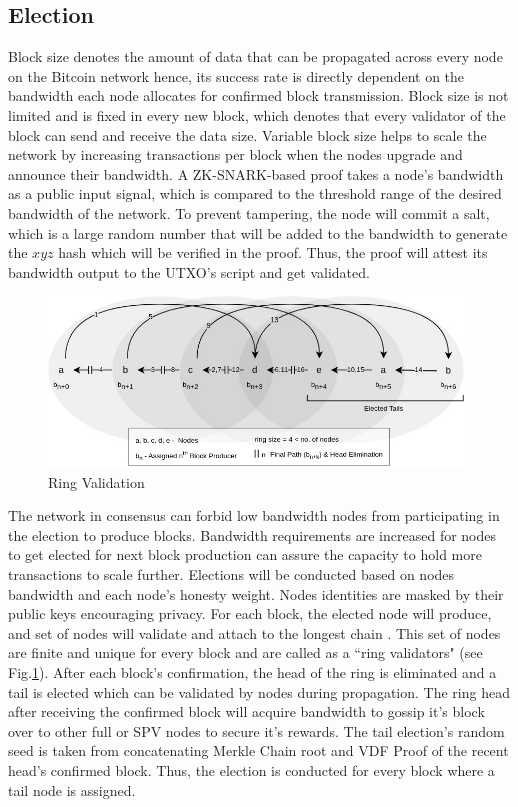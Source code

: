 \documentclass[a4paper,10pt]{article}
\begin{document}
\subsection{Election}
Block size denotes the amount of data that can be propagated across every node on the Bitcoin network hence, its success rate is directly dependent on the bandwidth each node allocates for confirmed block transmission. Block size is not limited and is fixed in every new block, which denotes that every validator of the block can send and receive the data size. Variable block size helps to scale the network by increasing transactions per block when the nodes upgrade and announce their bandwidth. A ZK-SNARK-based proof takes a node’s bandwidth as a public input signal, which is compared to the threshold range of the desired bandwidth of the network. To prevent tampering, the node will commit a salt, which is a large random number that will be added to the bandwidth to generate the $xyz$ hash which will be verified in the proof. Thus, the proof will attest its bandwidth output to the UTXO’s script and get validated. 
\begin{figure}[h]
\begin{center}
\includegraphics[width=11cm]{ring}
\caption{Ring Validation}
\label{ring}
\end{center}
\end{figure}
The network in consensus can forbid low bandwidth nodes from participating in the election to produce blocks. Bandwidth requirements are increased for nodes to get elected for next block production can assure the capacity to hold more transactions to scale further. Elections will be conducted based on nodes bandwidth and each node's honesty weight. Nodes identities are masked by their public keys encouraging privacy. For each block, the elected node will produce, and set of nodes will validate and attach to the longest chain \cite{nakamoto2008bitcoin} . This set of nodes are finite and unique for every block and are called as a ``ring validators" (see Fig.\ref{ring}). After each block's confirmation, the head of the ring is eliminated and a tail is elected which can be validated by nodes during propagation. The ring head after receiving the confirmed block will acquire bandwidth to gossip it's block over to other full or SPV nodes to secure it's rewards. The tail election's random seed is taken from concatenating Merkle Chain root and VDF Proof \cite{yakovenko2018solana} of the recent head's confirmed block. Thus, the election is conducted for every block where a tail node is assigned.
\end{document}
